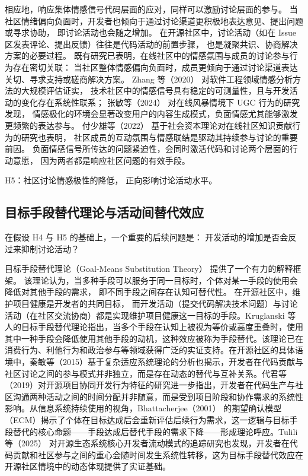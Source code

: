 \documentclass[
    type = master, %
    degree = professional,        %
    decl-page,  %
    twoside,                %
    fontset = fandol %
  ]{njuthesis}
\begin{document}
相应地，响应集体情感信号代码层面的应对，同样可以激励讨论层面的参与。
当社区情绪偏向负面时，开发者也倾向于通过讨论渠道更积极地表达意见、提出问题或寻求协助，
即讨论活动也会随之增加。
在开源社区中，讨论活动（如在 Issue 区发表评论、提出反馈）往往是代码活动的前置步骤，
也是凝聚共识、协商解决方案的必要过程\cite{guzzi2013}。
既有研究已表明，在线社区中的情感氛围与成员的讨论参与行为存在密切关联：
当社区整体情感偏向负面时，成员更倾向于通过讨论渠道表达关切、寻求支持或磋商解决方案\cite{qin2020contribution,qin2017user}。
Zhang 等（2020）\cite{zhang2020sentiment} 对软件工程领域情感分析方法的大规模评估证实，
技术社区中的情感信号具有稳定的可测量性，且与开发活动的变化存在系统性联系；
张敏等（2024）\cite{zhang2024ugc} 对在线风暴情境下 UGC 行为的研究发现，
情感极化的环境会显著改变用户的内容生成模式，负面情感尤其能够激发更频繁的表达参与。
付少雄等（2022）\cite{fu2022social} 基于社会资本理论对在线社区知识贡献行为的研究也表明，
社区成员的互动氛围与情感联结是驱动其持续参与讨论的重要前因。
负面情感信号所传达的问题紧迫性，会同时激活代码和讨论两个层面的行动意愿，
因为两者都是响应社区问题的有效手段。

H5：社区讨论情感极性的降低，
正向影响讨论活动水平。

\subsection{目标手段替代理论与活动间替代效应}

在假设 H4 与 H5 的基础上，一个重要的后续问题是：
开发活动的增加是否会反过来抑制讨论活动？

目标手段替代理论（Goal-Means Substitution Theory）\cite{kruglanski2002theory}
提供了一个有力的解释框架。
该理论认为，当多种手段可以服务于同一目标时，个体对某一手段的使用会降低对其他手段的需求，
即不同手段之间存在认知可替代性。
在开源社区中，维护项目健康是开发者的共同目标，
而开发活动（提交代码解决技术问题）与讨论活动（在社区交流协商）都是实现维护项目健康这一目标的手段。Kruglanski 等人\cite{kruglanski2002theory}的目标手段替代理论指出，当多个手段在认知上被视为等价或高度重叠时，使用其中一种手段会降低使用其他手段的动机，这种效应被称为手段替代。该理论已在消费行为、利他行为和政治参与等领域获得广泛的实证支持。在开源社区的具体语境中，秦敏等（2015）\cite{qin2015cas}基于复杂适应系统理论的分析也揭示，开发者在代码贡献与社区讨论之间的参与模式并非独立，而是存在动态的替代与互补关系。代君等（2019）\cite{dai2019collaborative}对开源项目协同开发行为特征的研究进一步指出，开发者在代码生产与社区沟通两种活动之间的时间分配并非随意，而是受到项目阶段和协作需求的系统性影响。从信息系统持续使用的视角，Bhattacherjee（2001）\cite{bhattacherjee2001understanding} 的期望确认模型（ECM）揭示了个体在目标达成后会重新评估后续行为需求，这一逻辑与目标手段替代的核心命题——手段达成后替代手段的需求下降——形成理论呼应。Tulili 等（2025）\cite{tulili2025exploring} 对开源生态系统核心开发者流动模式的追踪研究也发现，开发者在代码贡献和社区参与之间的重心会随时间发生系统性转移，这为目标手段替代效应在开源社区情境中的动态体现提供了实证基础。
\end{document}
